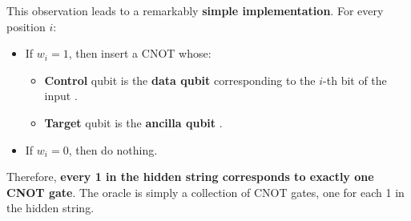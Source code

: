 \highspace
This observation leads to a remarkably \textbf{simple implementation}. For every position $i$:
\begin{itemize}
    \item If $w_i = 1$, then insert a CNOT whose:
    \begin{itemize}
        \item \textbf{Control} qubit is the \textbf{data qubit}  corresponding to the $i$-th bit of the input .
        \item \textbf{Target} qubit is the \textbf{ancilla qubit} .
    \end{itemize}
    \item If $w_i = 0$, then do nothing.
\end{itemize}
Therefore, \textbf{every 1 in the hidden string corresponds to exactly one CNOT gate}. The oracle is simply a collection of CNOT gates, one for each 1 in the hidden string.

